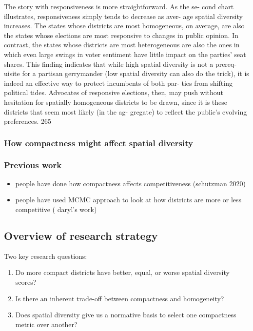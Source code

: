 \documentclass[]{article}
\providecommand{\tightlist}{%
  \setlength{\itemsep}{0pt}\setlength{\parskip}{0pt}}
\begin{document}
The story with responsiveness is more straightforward. As the se- cond
chart illustrates, responsiveness simply tends to decrease as aver- age
spatial diversity increases. The states whose districts are most
homogeneous, on average, are also the states whose elections are most
responsive to changes in public opinion. In contrast, the states whose
districts are most heterogeneous are also the ones in which even large
swings in voter sentiment have little impact on the parties' seat
shares. This finding indicates that while high spatial diversity is not
a prereq- uisite for a partisan gerrymander (low spatial diversity can
also do the trick), it is indeed an effective way to protect incumbents
of both par- ties from shifting political tides. Advocates of responsive
elections, then, may push without hesitation for spatially homogeneous
districts to be drawn, since it is these districts that seem most likely
(in the ag- gregate) to reflect the public's evolving preferences. 265

\cite{steph2012}

\hypertarget{how-compactness-might-affect-spatial-diversity}{%
\subsubsection{How compactness might affect spatial
diversity}\label{how-compactness-might-affect-spatial-diversity}}

\hypertarget{previous-work}{%
\subsubsection{Previous work}\label{previous-work}}

\begin{itemize}
\tightlist
\item
  people have done how compactness affects competitiveness (schutzman
  2020)
\item
  people have used MCMC approach to look at how districts are more or
  less competitive ( daryl's work)
\end{itemize}

\hypertarget{overview-of-research-strategy}{%
\subsection{Overview of research
strategy}\label{overview-of-research-strategy}}

Two key research questions:

\begin{enumerate}
\def\labelenumi{\arabic{enumi}.}
\tightlist
\item
  Do more compact districts have better, equal, or worse spatial
  diversity scores?
\item
  Is there an inherent trade-off between compactness and homogeneity?
\item
  Does spatial diversity give us a normative basis to select one
  compactness metric over another?
\end{enumerate}
\end{document}
